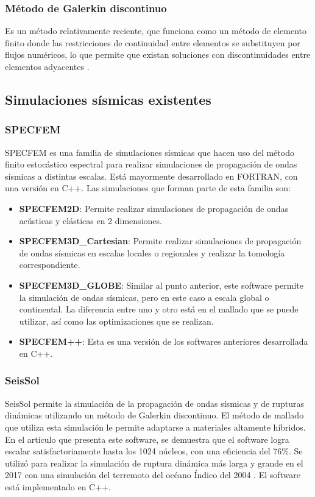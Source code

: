 \subsubsection{Método de Galerkin discontinuo}
  Es un método relativamente reciente, que funciona como un método de elemento finito donde las restricciones de continuidad entre elementos se substituyen por flujos numéricos, lo que permite que existan soluciones con discontinuidades entre elementos adyacentes \cite{Fichtner2011}.
\subsection{Simulaciones sísmicas existentes}
\subsubsection{SPECFEM}
SPECFEM \cite{Peter_Forward_and_adjoint_2011} es una familia de simulaciones sísmicas que hacen uso del método finito estocástico espectral para realizar simulaciones de propagación de ondas sísmicas a distintas escalas. Está mayormente desarrollado en FORTRAN, con una versión en C++.
Las simulaciones que forman parte de esta familia son:
\begin{itemize}
  \item \textbf{SPECFEM2D}: Permite realizar simulaciones de propagación de ondas acústicas y elásticas en 2 dimensiones.
  \item \textbf{SPECFEM3D\_Cartesian}: Permite realizar simulaciones de propagación de ondas sísmicas en escalas locales o regionales y realizar la tomología correspondiente.
  \item \textbf{SPECFEM3D\_GLOBE}: Similar al punto anterior, este software permite la simulación de ondas sísmicas, pero en este caso a escala global o continental. La diferencia entre uno y otro está en el mallado que se puede utilizar, así como las optimizaciones que se realizan.
  \item \textbf{SPECFEM++}: Esta es una versión de los softwares anteriores desarrollada en C++. \end{itemize}
\subsubsection{SeisSol}
SeisSol \cite{Kser2010} permite la simulación de la propagación de ondas sísmicas y de rupturas dinámicas utilizando un método de Galerkin discontinuo. El método de mallado que utiliza esta simulación le permite adaptarse a materiales altamente híbridos. En el artículo que presenta este software, se demuestra que el software logra escalar satisfactoriamente hasta los 1024 núcleos, con una eficiencia del 76\%. Se utilizó para realizar la simulación de ruptura dinámica más larga y grande en el 2017 con una simulación del terremoto del océano Índico del 2004 \cite{Uphoff2017}. El software está implementado en C++.

